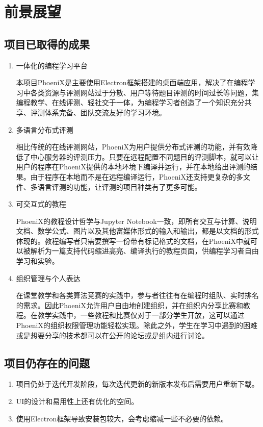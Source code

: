 \chapter{前景展望}

\section{项目已取得的成果}

\begin{enumerate}
\item{一体化的编程学习平台}
\par
本项目PhoeniX是主要使用Electron框架搭建的桌面端应用，解决了在编程学习中各类资源与评测网站过于分散、用户等待题目评测的时间过长等问题，集编程教学、在线评测、轻社交于一体，为编程学习者创造了一个知识充分共享、评测体系完备、团队交流友好的学习环境。

\item{多语言分布式评测}
\par
相比传统的在线评测网站，PhoeniX为用户提供分布式评测的功能，并有效降低了中心服务器的评测压力。只要在远程配置不同题目的评测脚本，就可以让用户的程序在PhoeniX提供的本地环境下编译并运行，并在本地给出评测的结果。由于程序在本地而不是在远程编译运行，PhoeniX还支持更复杂的多文件、多语言评测的功能，让评测的项目种类有了更多可能。

\item{可交互式的教程}
\par
PhoeniX的教程设计哲学与Jupyter Notebook一致，即所有交互与计算、说明文档、数学公式、图片以及其他富媒体形式的输入和输出，都是以文档的形式体现的。教程编写者只需要撰写一份带有标记格式的文档，在PhoeniX中就可以被解析为一篇支持代码缩进高亮、编译执行的教程页面，供编程学习者自由学习和实验。

\item{组织管理与个人表达}
\par
在课堂教学和各类算法竞赛的实践中，参与者往往有在编程时组队、实时排名的需求。因此PhoeniX允许用户自由地创建组织，并在组织内分享比赛和教程。在教学实践中，一些教程和比赛仅对于一部分学生开放，这可以通过PhoeniX的组织权限管理功能轻松实现。除此之外，学生在学习中遇到的困难或是想要分享的技术都可以在公开的论坛或是组内进行讨论。
\end{enumerate}
\newpage

\section{项目仍存在的问题}

\begin{enumerate}
    \item 项目仍处于迭代开发阶段，每次迭代更新的新版本发布后需要用户重新下载。
    \item UI的设计和易用性上还有优化的空间。
    \item 使用Electron框架导致安装包较大，会考虑缩减一些不必要的依赖。
\end{enumerate}

